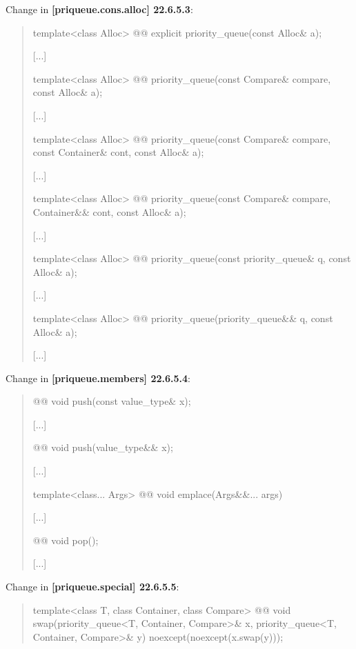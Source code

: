 \documentclass{wg21}
\begin{document}
Change in \textbf{[priqueue.cons.alloc] 22.6.5.3}:
\begin{quote}
\begin{itemdecl}
template<class Alloc> @@ explicit priority_queue(const Alloc& a);
\end{itemdecl}
[...]
\begin{itemdecl}
template<class Alloc> @@ priority_queue(const Compare& compare, const Alloc& a);
\end{itemdecl}
[...]
\begin{itemdecl}
template<class Alloc>
  @@ priority_queue(const Compare& compare, const Container& cont, const Alloc& a);
\end{itemdecl}
[...]
\begin{itemdecl}
template<class Alloc>
  @@ priority_queue(const Compare& compare, Container&& cont, const Alloc& a);	
\end{itemdecl}
[...]
\begin{itemdecl}
template<class Alloc> @@ priority_queue(const priority_queue& q, const Alloc& a);
\end{itemdecl}
[...]
\begin{itemdecl}
template<class Alloc> @@ priority_queue(priority_queue&& q, const Alloc& a);
\end{itemdecl}
[...]
\end{quote}

Change in \textbf{[priqueue.members] 22.6.5.4}:
\begin{quote}
\begin{itemdecl}
@@ void push(const value_type& x);
\end{itemdecl}
[...]
\begin{itemdecl}
@@ void push(value_type&& x);
\end{itemdecl}
[...]
\begin{itemdecl}
template<class... Args> @@ void emplace(Args&&... args)
\end{itemdecl}
[...]
\begin{itemdecl}
@@ void pop();
\end{itemdecl}
[...]
\end{quote}

Change in \textbf{[priqueue.special] 22.6.5.5}:
\begin{quote}
\begin{itemdecl}
template<class T, class Container, class Compare>
  @@ void swap(priority_queue<T, Container, Compare>& x,
    priority_queue<T, Container, Compare>& y) noexcept(noexcept(x.swap(y)));
\end{itemdecl}

\end{quote}
\end{document}
